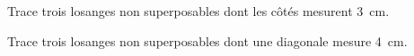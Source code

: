 \begin{myenumerate}
  \item Trace trois losanges non superposables dont les côtés mesurent 3~cm.
  \item Trace trois losanges non superposables dont une diagonale mesure 4~cm.
\end{myenumerate}